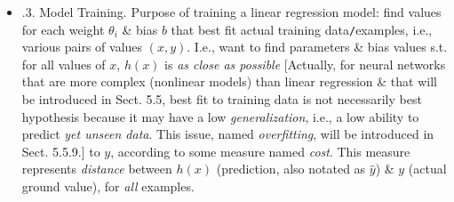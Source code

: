 \documentclass{article}
\begin{document}
\begin{itemize}
\begin{itemize}
\begin{itemize}
			\item {.3. Model Training.} Purpose of training a linear regression model: find values for each weight $\theta_i$ \& bias $b$ that best fit actual training data{\tt/}examples, i.e., various pairs of values $(x,y)$. I.e., want to find parameters \& bias values s.t. for all values of $x$, $h(x)$ is {\it as close as possible} [Actually, for neural networks that are more complex (nonlinear models) than linear regression \& that will be introduced in Sect. 5.5, best fit to training data is not necessarily best hypothesis because it may have a low {\it generalization}, i.e., a low ability to predict {\it yet unseen data}. This issue, named {\it overfitting}, will be introduced in Sect. 5.5.9.] to $y$, according to some measure named {\it cost}. This measure represents {\it distance} between $h(x)$ (prediction, also notated as $\hat{y}$) \& $y$ (actual ground value), for {\it all} examples.


\end{itemize}
\end{itemize}
\end{itemize}
\end{document}
